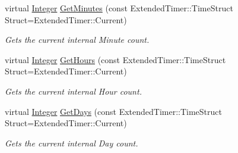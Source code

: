 \begin{DoxyCompactItemize}
virtual \hyperlink{namespacephys_a7f09bf5585b2bb97613cd9aad4273a81}{Integer} \hyperlink{classphys_1_1ExtendedTimer_a4081b9972f76c424b4ca067c8358a926}{GetMinutes} (const ExtendedTimer::TimeStruct Struct=ExtendedTimer::Current)
\begin{DoxyCompactList}\small\item\em Gets the current internal Minute count. \item\end{DoxyCompactList}\item 
virtual \hyperlink{namespacephys_a7f09bf5585b2bb97613cd9aad4273a81}{Integer} \hyperlink{classphys_1_1ExtendedTimer_af5cada222452ad347062efa9eb6f365a}{GetHours} (const ExtendedTimer::TimeStruct Struct=ExtendedTimer::Current)
\begin{DoxyCompactList}\small\item\em Gets the current internal Hour count. \item\end{DoxyCompactList}\item 
virtual \hyperlink{namespacephys_a7f09bf5585b2bb97613cd9aad4273a81}{Integer} \hyperlink{classphys_1_1ExtendedTimer_ac3fe4d0a31999d8f6e3a900f8aaa6816}{GetDays} (const ExtendedTimer::TimeStruct Struct=ExtendedTimer::Current)
\begin{DoxyCompactList}\small\item\em Gets the current internal Day count. \item\end{DoxyCompactList}\end{DoxyCompactItemize}
